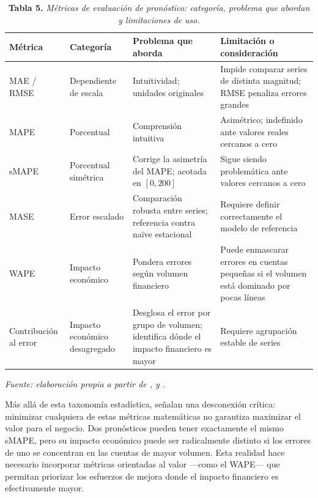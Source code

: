 \begin{table}[H]
\caption{\textbf{Tabla 5.} \textit{Métricas de evaluación de pronóstico: categoría, problema que abordan y limitaciones de uso.}}
\label{tab:metricas}
\vspace{4pt}
\begin{tabular}{>{\raggedright\arraybackslash}p{2.5cm} >{\raggedright\arraybackslash}p{2cm} >{\raggedright\arraybackslash}p{4cm} >{\raggedright\arraybackslash}p{5cm}}
\toprule
\textbf{Métrica} & \textbf{Categoría} & \textbf{Problema que aborda} & \textbf{Limitación o consideración} \\
\midrule
MAE / RMSE & Dependiente de escala & Intuitividad; unidades originales & Impide comparar series de distinta magnitud; RMSE penaliza errores grandes \parencite{Petropoulos2022} \\
MAPE & Porcentual & Comprensión intuitiva & Asimétrico; indefinido ante valores reales cercanos a cero \parencite{Petropoulos2022} \\
sMAPE & Porcentual simétrica & Corrige la asimetría del MAPE; acotada en $[0, 200]$ & Sigue siendo problemática ante valores cercanos a cero \parencite{Hyndman2021} \\
MASE & Error escalado & Comparación robusta entre series; referencia contra naïve estacional & Requiere definir correctamente el modelo de referencia \parencite{Hyndman2021} \\
WAPE & Impacto económico & Pondera errores según volumen financiero & Puede enmascarar errores en cuentas pequeñas si el volumen está dominado por pocas líneas \parencite{Makridakis2022} \\
Contribución al error & Impacto económico desagregado & Desglosa el error por grupo de volumen; identifica dónde el impacto financiero es mayor & Requiere agrupación estable de series \parencite{Makridakis2022} \\
\bottomrule
\end{tabular}
\vspace{4pt}

\small\textit{Fuente: elaboración propia a partir de \textcite{Petropoulos2022}, \textcite{Hyndman2021} y \textcite{Makridakis2022}.}
\end{table}

Más allá de esta taxonomía estadística, \textcite{Makridakis2025M6} señalan una desconexión crítica: minimizar cualquiera de estas métricas matemáticas no garantiza maximizar el valor para el negocio. Dos pronósticos pueden tener exactamente el mismo sMAPE, pero su impacto económico puede ser radicalmente distinto si los errores de uno se concentran en las cuentas de mayor volumen. Esta realidad hace necesario incorporar métricas orientadas al valor ---como el WAPE--- que permitan priorizar los esfuerzos de mejora donde el impacto financiero es efectivamente mayor.

